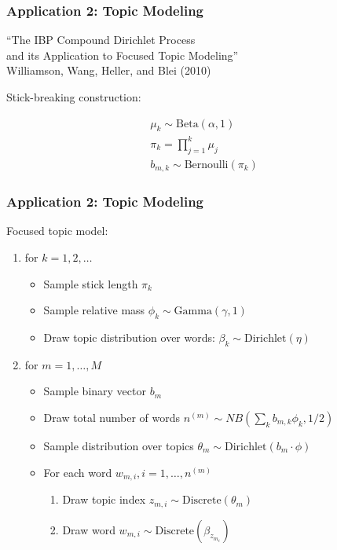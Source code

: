 \documentclass[13pt]{beamer}
\begin{document}
\begin{frame}
\frametitle{Application 2: Topic Modeling}

\begin{center}
``The IBP Compound Dirichlet Process \\
and its Application to Focused Topic Modeling'' \\
Williamson, Wang, Heller, and Blei (2010)
\end{center}

Stick-breaking construction:

\begin{eqnarray*}
\mu_k \sim \text{Beta}(\alpha, 1) \\
\pi_k = \prod_{j=1}^k \mu_j \\
b_{m,k} \sim \text{Bernoulli}(\pi_k) 
\end{eqnarray*}


\end{frame}
\begin{frame}
\frametitle{Application 2: Topic Modeling}


Focused topic model:
\begin{enumerate}
\item for $k=1,2,\ldots$
  \begin{itemize}
  \item Sample stick length $\pi_k$
  \item Sample relative mass $\phi_k \sim \text{Gamma}(\gamma, 1)$
  \item Draw topic distribution over words: $\beta_k \sim \text{Dirichlet}(\eta)$
  \end{itemize}
\item for $m=1,\ldots,M$
  \begin{itemize}
  \item Sample binary vector $b_m$
  \item Draw total number of words $n^{(m)} \sim NB(\sum_k b_{m,k} \phi_k, 1/2)$
  \item Sample distribution over topics $\theta_m \sim \text{Dirichlet}(b_m \cdot \phi)$
  \item For each word $w_{m,i}, i=1,\ldots,n^{(m)}$
    \begin{enumerate}
    \item Draw topic index $z_{m,i} \sim \text{Discrete}(\theta_m)$ 
    \item Draw word $w_{m,i} \sim \text{Discrete}(\beta_{z_{m_i}})$
    \end{enumerate}
  \end{itemize}
\end{enumerate}

\end{frame}
\end{document}
